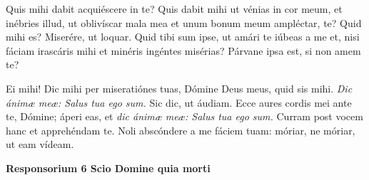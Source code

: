 \documentclass[options]{article}
\begin{document}
	Quis mihi dabit acquiéscere in te? Quis dabit mihi ut vénias in cor meum, et inébries illud, ut oblivíscar mala mea et unum bonum meum ampléctar, te? Quid mihi es? Miserére, ut loquar. Quid tibi sum ipse, ut amári te iúbeas a me et, nisi fáciam irascáris mihi et minéris ingéntes misérias? Párvane ipsa est, si non amem te?
	
	  Ei mihi! Dic mihi per miseratiónes tuas, Dómine Deus meus, quid sis mihi.
	  \textit{Dic ánimæ meæ: Salus tua ego sum.} 
	  Sic dic, ut áudiam. Ecce aures cordis mei ante te, Dómine; áperi eas, et 
	  \textit{dic ánimæ meæ: Salus tua ego sum. } 
	  Curram post vocem hanc et apprehéndam te. Noli abscóndere a me fáciem tuam: móriar, ne móriar, ut eam vídeam.
	
	\textbf{Responsorium 6 Scio Domine quia morti}
	
\end{document}
